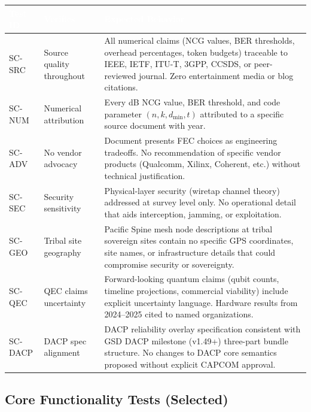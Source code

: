\documentclass[11pt,letterpaper]{article}
\newcommand{\tableheader}[1]{\textbf{\sffamily\textcolor{white}{#1}}}
\begin{document}
\begin{center}
\begin{tabularx}{\textwidth}{L{1.5cm}L{4cm}X}
\toprule
{}
\tableheader{Test ID} & \tableheader{Verifies} & \tableheader{Expected Behavior} \\
\midrule
SC-SRC & Source quality throughout & All numerical claims (NCG values, BER thresholds, overhead percentages, token budgets) traceable to IEEE, IETF, ITU-T, 3GPP, CCSDS, or peer-reviewed journal. Zero entertainment media or blog citations. \\
SC-NUM & Numerical attribution & Every dB NCG value, BER threshold, and code parameter $(n, k, d_{\min}, t)$ attributed to a specific source document with year. \\
SC-ADV & No vendor advocacy & Document presents FEC choices as engineering tradeoffs. No recommendation of specific vendor products (Qualcomm, Xilinx, Coherent, etc.) without technical justification. \\
SC-SEC & Security sensitivity & Physical-layer security (wiretap channel theory) addressed at survey level only. No operational detail that aids interception, jamming, or exploitation. \\
SC-GEO & Tribal site geography & Pacific Spine mesh node descriptions at tribal sovereign sites contain no specific GPS coordinates, site names, or infrastructure details that could compromise security or sovereignty. \\
SC-QEC & QEC claims uncertainty & Forward-looking quantum claims (qubit counts, timeline projections, commercial viability) include explicit uncertainty language. Hardware results from 2024--2025 cited to named organizations. \\
SC-DACP & DACP spec alignment & DACP reliability overlay specification consistent with GSD DACP milestone (v1.49+) three-part bundle structure. No changes to DACP core semantics proposed without explicit CAPCOM approval. \\
\bottomrule
\end{tabularx}
\end{center}

\subsection{Core Functionality Tests (Selected)}
\end{document}
